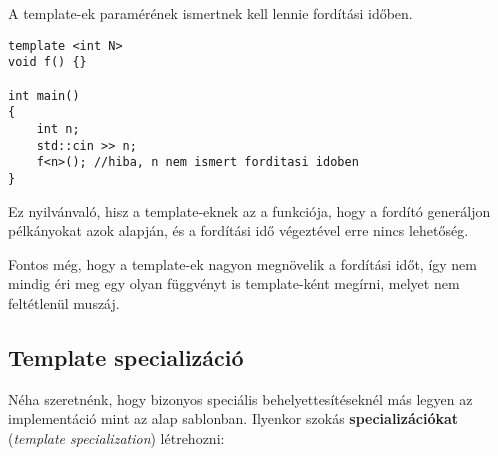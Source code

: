 \documentclass[a4paper,11.5pt]{article}
\begin{document}
	A template-ek paramérének ismertnek kell lennie fordítási időben.
	\begin{lstlisting}
template <int N>
void f() {}

int main()
{
	int n;
	std::cin >> n;
	f<n>(); //hiba, n nem ismert forditasi idoben
}
	\end{lstlisting}
	Ez nyilvánvaló, hisz a template-eknek az a funkciója, hogy a fordító generáljon pélkányokat azok alapján, és a fordítási idő végeztével erre nincs lehetőség.
	
	\medskip
	Fontos még, hogy a template-ek nagyon megnövelik a fordítási időt, így nem mindig éri meg egy olyan függvényt is template-ként megírni, melyet nem feltétlenül muszáj.
	\subsection{Template specializáció}
	Néha szeretnénk, hogy bizonyos speciális behelyettesítéseknél más legyen az implementáció mint az alap sablonban. Ilyenkor szokás \textbf{specializációkat} (\textit{template specialization}) létrehozni:
	
\end{document}
